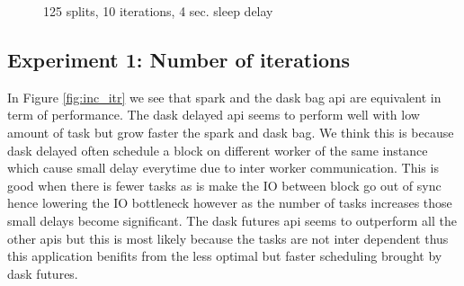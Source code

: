\documentclass[11pt,a4paper]{article}
\begin{document}
\begin{figure}[htp]
    \centering
    
    \caption{125 splits, 10 iterations, 4 sec. sleep delay}
    \label{fig:inc_node}
\end{figure}



\subsection{Experiment 1: Number of iterations}
In Figure \ref{fig:inc_itr} we see that spark and the dask bag api are equivalent in
term of performance. The dask delayed api seems to perform well with low amount of
task but grow faster the spark and dask bag. We think this is because dask delayed
often schedule a block on different worker of the same instance which cause small
delay everytime due to inter worker communication. This is good when there is fewer
tasks as is make the IO between block go out of sync hence lowering the IO bottleneck
however as the number of tasks increases those small delays become significant. The
dask futures api seems to outperform all the other apis but this is most likely
because the tasks are not inter dependent thus this application benifits from the
less optimal but faster scheduling brought by dask futures.
\end{document}
